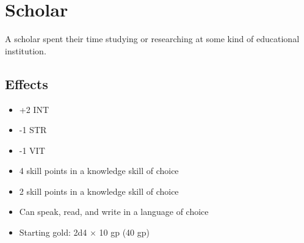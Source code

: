 \section{Scholar}\label{background:scholar}
A scholar spent their time studying or researching at some kind of educational
institution.

\subsection{Effects}
\begin{itemize}
    \item +2 INT
    \item -1 STR
    \item -1 VIT
    \item 4 skill points in a knowledge skill of choice
    \item 2 skill points in a knowledge skill of choice
    \item Can speak, read, and write in a language of choice
    \item Starting gold: 2d4 $\times$ 10 gp (40 gp)
\end{itemize}
